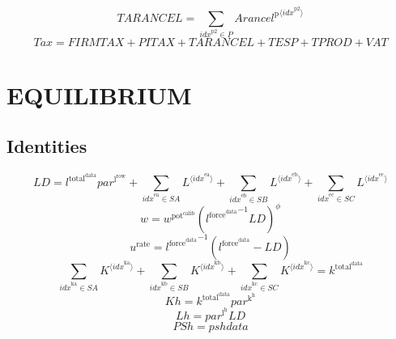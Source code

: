 \begin{equation}
{T\!A\!R\!A\!N\!C\!E\!L} = \sum_{{i\!d\!x}^{\mathrm{p2}}\in P} {{A\!r\!a\!n\!c\!e\!l}^{\mathrm{p}}}^{\langle {i\!d\!x}^{\mathrm{p2}}\rangle}
\end{equation}
\begin{equation}
{T\!a\!x} = {F\!I\!R\!M\!T\!A\!X} + {P\!I\!T\!A\!X} + {T\!A\!R\!A\!N\!C\!E\!L} + {T\!E\!S\!P} + {T\!P\!R\!O\!D} + {V\!A\!T}
\end{equation}




\section{EQUILIBRIUM}

\subsection{Identities}

\begin{equation}
{L\!D} = {l^{\mathrm{total}^{\mathrm{data}}}} {{p\!a\!r}^{\mathrm{l}^{\mathrm{row}}}} + \sum_{{i\!d\!x}^{\mathrm{ea}}\in {S\!A}} {L}^{\langle {i\!d\!x}^{\mathrm{ea}}\rangle} + \sum_{{i\!d\!x}^{\mathrm{eb}}\in {S\!B}} {L}^{\langle {i\!d\!x}^{\mathrm{eb}}\rangle} + \sum_{{i\!d\!x}^{\mathrm{ec}}\in {S\!C}} {L}^{\langle {i\!d\!x}^{\mathrm{ec}}\rangle}
\end{equation}
\begin{equation}
w = {w^{\mathrm{pot}^{\mathrm{calib}}}} {\left({l^{\mathrm{force}^{\mathrm{data}}}}^{-1} {{L\!D}}\right)^{\phi}}
\end{equation}
\begin{equation}
u^{\mathrm{rate}} = {l^{\mathrm{force}^{\mathrm{data}}}}^{-1} \left(l^{\mathrm{force}^{\mathrm{data}}} - {L\!D}\right)
\end{equation}
\begin{equation}
\sum_{{i\!d\!x}^{\mathrm{ka}}\in {S\!A}} {K}^{\langle {i\!d\!x}^{\mathrm{ka}}\rangle} + \sum_{{i\!d\!x}^{\mathrm{kb}}\in {S\!B}} {K}^{\langle {i\!d\!x}^{\mathrm{kb}}\rangle} + \sum_{{i\!d\!x}^{\mathrm{kc}}\in {S\!C}} {K}^{\langle {i\!d\!x}^{\mathrm{kc}}\rangle} = k^{\mathrm{total}^{\mathrm{data}}}
\end{equation}
\begin{equation}
{K\!h} = {k^{\mathrm{total}^{\mathrm{data}}}} {{p\!a\!r}^{\mathrm{k}^{\mathrm{h}}}}
\end{equation}
\begin{equation}
{L\!h} = {{p\!a\!r}^{\mathrm{l}^{\mathrm{h}}}} {{L\!D}}
\end{equation}
\begin{equation}
{P\!S\!h} = {p\!s\!h\!d\!a\!t\!a}
\end{equation}




